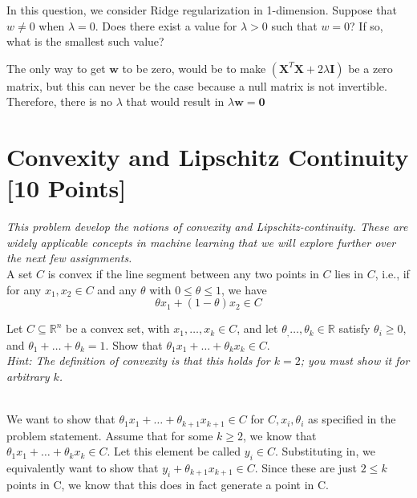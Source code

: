 \subproblem In this question, we consider Ridge regularization in 1-dimension. Suppose that $w \neq 0$ when $\lambda = 0$. Does there exist a value for $\lambda > 0$ such that $w = 0$? If so, what is the smallest such value?

\begin{subsolution}
  The only way to get $\mathbf{w}$ to be zero, would be to make $(\mathbf{X}^T\mathbf{X} + 2\lambda\mathbf{I})$ be a zero matrix, but this can never be the case because a null matrix is not invertible. Therefore, there is no $\lambda$ that would result in $\lambda\mathbf{w} = \mathbf{0}$
\end{subsolution}


\newpage

\section{Convexity and Lipschitz Continuity [10 Points]}

\emph{This problem develop the notions of convexity and Lipschitz-continuity. These are widely applicable concepts in machine learning that we will explore further over the next few assignments.} \\

A set $C$ is convex if the line segment between any two points in $C$ lies in $C$, i.e.,
if for any $x_1, x_2 \in C$ and any $\theta$ with $0 \leq \theta \leq 1$, we have
\[\theta x_1  + (1 - \theta)x_2 \in C\]

\problem[5] Let $C \subseteq \mathbb{R}^n$ be a convex set, with $x_1, \dots, x_k\in C$, and let $\theta_, \dots, \theta_k \in \mathbb{R}$ satisfy $\theta_i\geq 0$, and 
$\theta_1 + \dots + \theta_k = 1$. Show that $\theta_1 x_1 + \dots + \theta_k x_k \in C$. \\
\emph{Hint: The definition of convexity is that this holds for $k = 2$; you must show it for arbitrary $k$.}\\

\begin{solution}
  \\
  We want to show that $\theta_1 x_1 + \dots + \theta_{k+1} x_{k+1} \in C$ for $C, x_i, \theta_i$ as specified in the problem statement. Assume that for some $k \geq 2$, we know that $\theta_1 x_1 + \dots + \theta_k x_k \in C$. Let this element be called $y_i \in C$. Substituting in, we equivalently want to show that $y_i + \theta_{k+1} x_{k+1} \in C$. Since these are just $2 \leq k$ points in C, we know that this does in fact generate a point in C.
\end{solution}

